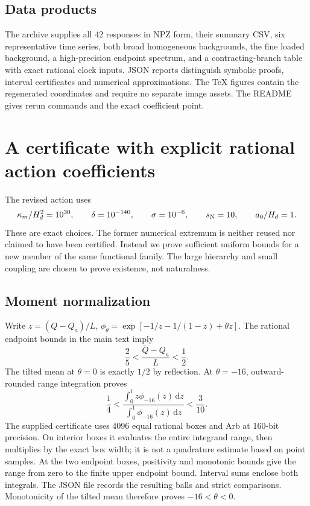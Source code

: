 \documentclass[aps,prd,reprint,onecolumn,notitlepage,nofootinbib,longbibliography,floatfix]{revtex4-2}
\theoremstyle{scstyle}
\theoremstyle{definition}
\theoremstyle{remark}
\newcommand{\dd}{\mathrm{d}}
\newcommand{\kap}{\kappa_m}
\begin{document}
\subsection{Data products}
The archive supplies all 42 responses in NPZ form, their summary CSV, six representative time series, both broad homogeneous backgrounds, the fine loaded background, a high-precision endpoint spectrum, and a contracting-branch table with exact rational clock inputs. JSON reports distinguish symbolic proofs, interval certificates and numerical approximations. The TeX figures contain the regenerated coordinates and require no separate image assets. The README gives rerun commands and the exact coefficient point.

\section{A certificate with explicit rational action coefficients}
\label{app:rationalCertificate}
The revised action uses
\begin{equation}
 \kap/H_d^2=10^{30},\qquad \delta=10^{-140},\qquad
 \sigma=10^{-6},\qquad s_{\rm N}=10,\qquad a_0/H_d=1.
\end{equation}
These are exact choices. The former numerical extremum is neither
reused nor claimed to have been certified. Instead we prove sufficient
uniform bounds for a new member of the same functional family. The large
hierarchy and small coupling are chosen to prove existence, not naturalness.

\subsection{Moment normalization}
Write $z=(Q-Q_a)/L$, $\phi_\theta=\exp[-1/z-1/(1-z)+\theta z]$.
The rational endpoint bounds in the main text imply
\begin{equation}
 \frac25<\frac{\bar Q-Q_a}{L}<\frac12.
\end{equation}
The tilted mean at $\theta=0$ is exactly $1/2$ by reflection. At
$\theta=-16$, outward-rounded range integration proves
\begin{equation}
 \frac14<\frac{\int_0^1z\phi_{-16}(z)\,\dd z}
                   {\int_0^1\phi_{-16}(z)\,\dd z}<\frac3{10}.
 \label{eq:certMean}
\end{equation}
The supplied certificate uses 4096 equal rational boxes and Arb at
160-bit precision. On interior boxes it evaluates the entire integrand
range, then multiplies by the exact box width; it is not a quadrature
estimate based on point samples. At the two endpoint boxes, positivity
and monotonic bounds give the range from zero to the finite upper
endpoint bound. Interval sums enclose both integrals. The JSON file
records the resulting balls and strict comparisons. Monotonicity of the
tilted mean therefore proves $-16<\theta<0$.
\end{document}
